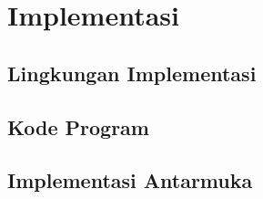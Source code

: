\chapter{Implementasi}
    \section{Lingkungan Implementasi}
        \Blindtext[5][1]
    \section{Kode Program}
        \Blindtext[5][1]
    \section{Implementasi Antarmuka}
        \Blindtext[5][1]
    \cleardoublepage
